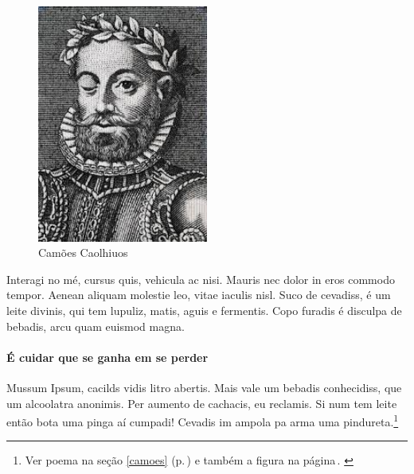 
\begin{figure}[h]
\centering
\includegraphics[width=0.5\textwidth]{image}
\caption{Camões Caolhiuos}
\label{fig:camoes}
\end{figure}

Interagi no mé, cursus quis, vehicula ac nisi. Mauris nec dolor in eros commodo
tempor. Aenean aliquam molestie leo, vitae iaculis nisl. Suco de cevadiss, é um
leite divinis, qui tem lupuliz, matis, aguis e fermentis. Copo furadis é
disculpa de bebadis, arcu quam euismod magna.



\paragraph{É cuidar que se ganha em se perder}

Mussum Ipsum, cacilds vidis litro abertis. Mais vale um bebadis conhecidiss,
que um alcoolatra anonimis. Per aumento de cachacis, eu reclamis. Si num tem
leite então bota uma pinga aí cumpadi! Cevadis im ampola pa arma uma pindureta.\footnote{Ver poema na 
		seção \ref{camoes} (p.\,\pageref{camoes}) e também 
		a figura na página\,\pageref{fig:camoes}.
		\label{notasobrecamoes}}


